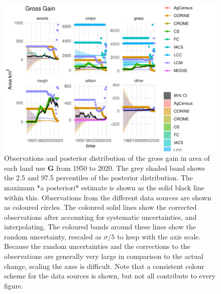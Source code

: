 \documentclass[
]{book}
\begin{document}
\begin{figure}
\includegraphics[width=1.3\linewidth]{Results_en_files/figure-latex/plotG-1} \caption{ Observations and posterior distribution of the gross gain in area of each land use $\mathbf{G}$ from 1950 to 2020.  The grey shaded band shows the 2.5 and 97.5 percentiles of the posterior distribution. The maximum *a posteriori* estimate is shown as the solid black line within this. Observations from the different data sources are shown as coloured circles. The coloured solid lines show the corrected observations after accounting for systematic uncertainties, and interpolating. The coloured bands around these lines show the random uncertainty, rescaled as $\sigma /5$ to keep with the axis scale. Because the random uncertainties and the corrections to the observations are generally very large in comparison to the actual change, scaling the axes is difficult. Note that a consistent colour scheme for the data sources is shown, but not all contribute to every figure.}\label{fig:plotG}
\end{figure}
\end{document}
